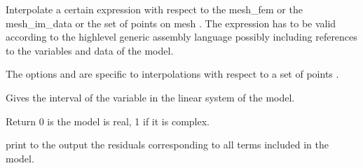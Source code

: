 \documentclass[a4paper,11pt,english]{sphinxmanual}
\begin{document}
\begin{fulllineitems}
\begin{fulllineitems}
Interpolate a certain expression with respect to the mesh\_fem 
or the mesh\_im\_data  or the set of points  on mesh .
The expression has to be valid according to the high\sphinxhyphen{}level generic
assembly language possibly including references to the variables
and data of the model.

The options  and  are specific to
interpolations with respect to a set of points .

\end{fulllineitems}


\begin{fulllineitems}
\label{\detokenize{python/cmdref_Model:getfem.Model.interval_of_variable}}
Gives the interval of the variable  in the linear system of
the model.

\end{fulllineitems}


\begin{fulllineitems}
\label{\detokenize{python/cmdref_Model:getfem.Model.is_complex}}
Return 0 is the model is real, 1 if it is complex.

\end{fulllineitems}


\begin{fulllineitems}
\label{\detokenize{python/cmdref_Model:getfem.Model.list_residuals}}
print to the output the residuals corresponding to all terms
included in the model.

\end{fulllineitems}



\end{fulllineitems}
\end{document}
